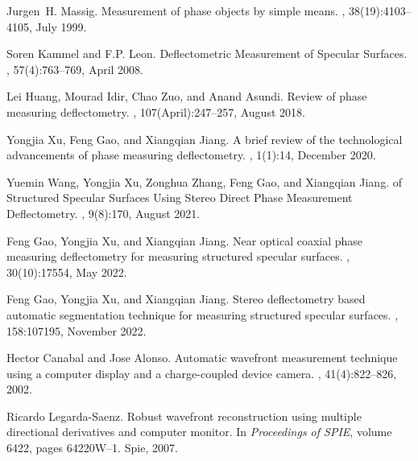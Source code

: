 \documentclass[12pt,letterpaper]{article}
\begin{document}
\newpage
\begin{thebibliography}{10}
	Jurgen~H. Massig.
	\newblock Measurement of phase objects by simple means.
	, 38(19):4103--4105, July 1999.
	
	Soren Kammel and F.P. Leon.
	\newblock Deflectometric {{Measurement}} of {{Specular Surfaces}}.
	,
	57(4):763--769, April 2008.
	
	Lei Huang, Mourad Idir, Chao Zuo, and Anand Asundi.
	\newblock Review of phase measuring deflectometry.
	, 107(April):247--257, August
	2018.
	
	Yongjia Xu, Feng Gao, and Xiangqian Jiang.
	\newblock A brief review of the technological advancements of phase measuring
	deflectometry.
	, 1(1):14, December 2020.
	
	Yuemin Wang, Yongjia Xu, Zonghua Zhang, Feng Gao, and Xiangqian Jiang.
	 of {{Structured Specular Surfaces Using Stereo
			Direct Phase Measurement Deflectometry}}.
	, 9(8):170, August 2021.
	
	Feng Gao, Yongjia Xu, and Xiangqian Jiang.
	\newblock Near optical coaxial phase measuring deflectometry for measuring
	structured specular surfaces.
	, 30(10):17554, May 2022.
	
	Feng Gao, Yongjia Xu, and Xiangqian Jiang.
	\newblock Stereo deflectometry based automatic segmentation technique for
	measuring structured specular surfaces.
	, 158:107195, November 2022.
	
	Hector Canabal and Jose Alonso.
	\newblock Automatic wavefront measurement technique using a computer display
	and a charge-coupled device camera.
	, 41(4):822--826, 2002.
	
	Ricardo {Legarda-Saenz}.
	\newblock Robust wavefront reconstruction using multiple directional
	derivatives and computer monitor.
	\newblock In {\em Proceedings of {{SPIE}}}, volume 6422, pages 64220W--1.
	{Spie}, 2007.
	

\end{thebibliography}
\end{document}
